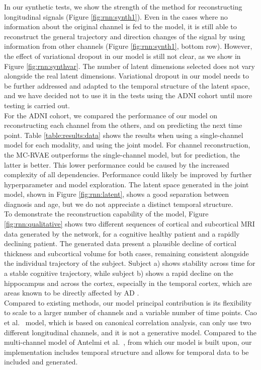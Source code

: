 In our synthetic tests, we show the strength of the method for reconstructing longitudinal signals (Figure \ref{fig:rnn:synth1}). Even in the cases where no information about the original channel is fed to the model, it is still able to reconstruct the general trajectory and direction changes of the signal by using information from other channels (Figure \ref{fig:rnn:synth1}, bottom row). However, the effect of variational dropout in our model is still not clear, as we show in Figure \ref{fig:rnn:synthvar}. The number of latent dimensions selected does not vary alongside the real latent dimensions. Variational dropout in our model needs to be further addressed and adapted to the temporal structure of the latent space, and we have decided not to use it in the tests using the ADNI cohort until more testing is carried out.  \\

For the ADNI cohort, we compared the performance of our model on reconstructing each channel from the others, and on predicting the next time point. Table \ref{table:results:data} shows the results when using a single-channel model for each modality, and using the joint model. For channel reconstruction, the MC-RVAE outperforms the single-channel model, but for prediction, the latter is better. This lower performance could be caused by the increased complexity of all dependencies. Performance could likely be improved by further hyperparameter and model exploration. The latent space generated in the joint model, shown in Figure \ref{fig:rnn:latent}, shows a good separation between diagnosis and age, but we do not appreciate a distinct temporal structure.  \\

To demonstrate the reconstruction capability of the model, Figure \ref{fig:rnn:qualitative} shows two different sequences of cortical and subcortical MRI data generated by the network, for a cognitive healthy patient and a rapidly declining patient. The generated data present a plausible decline of cortical thickness and subcortical volume for both cases, remaining consistent alongside the individual trajectory of the subject. Subject a) shows stability across time for a stable cognitive trajectory, while subject b) shows a rapid decline on the hippocampus and across the cortex, especially in the temporal cortex, which are areas known to be directly affected by AD \cite{Bakkour2013}. \\

Compared to existing methods, our model principal contribution is its flexibility to scale to a larger number of channels and a variable number of time points. Cao et al.\ \cite{Cao2019} model, which is based on canonical correlation analysis, can only use two different longitudinal channels, and it is not a generative model. Compared to the multi-channel model of Antelmi et al.\ \cite{Antelmi2019}, from which our model is built upon, our implementation includes temporal structure and allows for temporal data to be included and generated. \\

